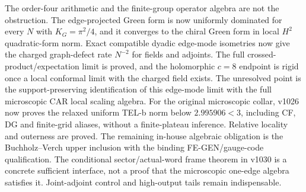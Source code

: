 \documentclass[11pt]{article}
\theoremstyle{remark}
\begin{document}
The order-four arithmetic and the finite-group operator algebra are not
the obstruction.  The edge-projected Green form is now uniformly
dominated for every $N$ with $K_G=\pi^2/4$, and it converges to the
chiral Green form in local $H^2$ quadratic-form norm.  Exact compatible
dyadic edge-mode isometries now give the charged graph-defect rate
$N^{-2}$ for fields and adjoints.  The full
crossed-product/expectation limit is proved, and the holomorphic $c=8$
endpoint is rigid once a local conformal limit with the charged field
exists.  The unresolved point is the support-preserving identification
of this edge-mode limit with the full microscopic CAR local scaling
algebra. For the original microscopic collar, v1026 now proves the
relaxed uniform TEL-b norm below $2.995906<3$, including CF, DG and
finite-grid aliases, without a finite-plateau inference. Relative locality and
outerness are proved.  The remaining in-house algebraic obligation is
the Buchholz--Verch upper inclusion with the binding FE-GEN/gauge-code
qualification. The conditional sector/actual-word frame theorem in v1030
is a concrete sufficient interface, not a proof that the microscopic
one-edge algebra satisfies it. Joint-adjoint control and high-output tails
remain indispensable.
\end{document}
